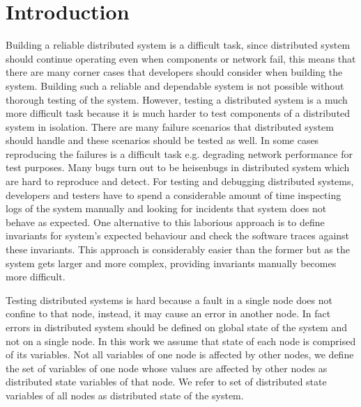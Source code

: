 \section{Introduction}

Building a reliable distributed system is a difficult task, since distributed system should continue operating even when components or network fail, this means that there are many corner cases that developers should consider when building the system. Building such 
a reliable and dependable system is not possible without thorough testing of the system. However, testing a distributed system is a much more difficult task because it is much harder to test components of a distributed system in isolation. There are many 
failure scenarios that distributed system should handle and these scenarios should be tested as well. In some cases reproducing the failures is a difficult task e.g. degrading network performance for test purposes. Many bugs turn out to be heisenbugs in distributed 
system which are hard to reproduce and detect. For testing and debugging distributed systems, developers and testers have to spend a considerable amount of time inspecting logs of the system manually and looking for incidents that system does not behave as 
expected. One alternative to this laborious approach is to define invariants for system's expected behaviour and check the software traces against these invariants. This approach is considerably easier than the former but as the system gets larger and more 
complex, providing invariants manually becomes more difficult.

Testing distributed systems is hard because a fault in a single node does not confine to that node, instead, it may cause an error in another node. In fact errors in distributed system should be defined on global state of the system and not on a single node. In this work we 
assume that state of each node is comprised of its variables. Not all variables of one node is affected by other nodes, we define the set of variables of one node whose values are affected by other nodes as distributed state variables of that node. We refer to set of distributed 
state variables of all nodes as distributed state of the system.


